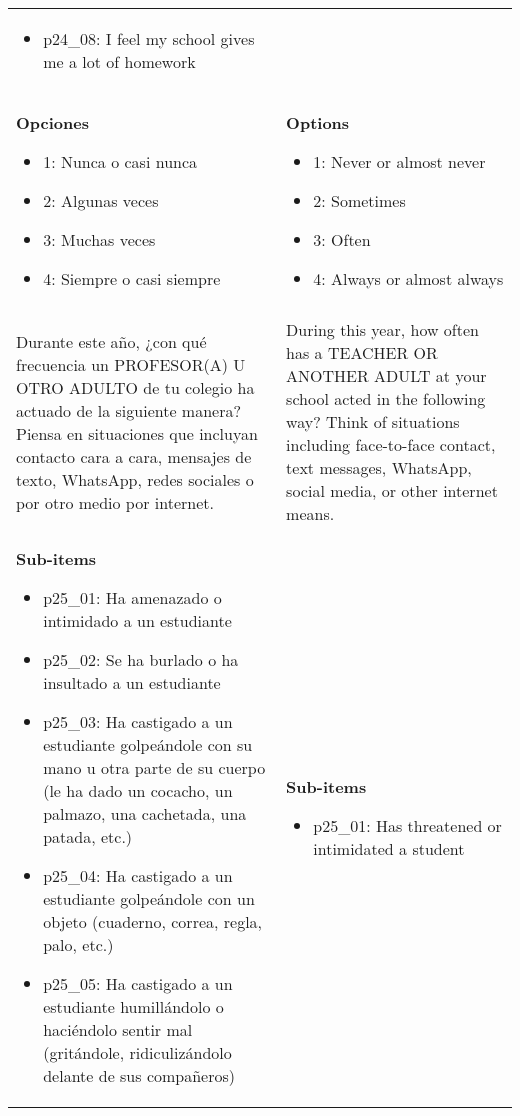 \documentclass[11pt]{article}
\begin{document}
\begin{longtable}{@{}LL@{}}
\begin{itemize}[leftmargin=*]
\item p24\_08: I feel my school gives me a lot of homework\end{itemize} \\
\textbf{Opciones}\par\begin{itemize}[leftmargin=*]\item 1: Nunca o casi nunca
\item 2: Algunas veces
\item 3: Muchas veces
\item 4: Siempre o casi siempre\end{itemize} & \textbf{Options}\par\begin{itemize}[leftmargin=*]\item 1: Never or almost never
\item 2: Sometimes
\item 3: Often
\item 4: Always or almost always\end{itemize} \\
\addlinespace[4pt]
 \\ 
Durante este año, ¿con qué frecuencia un PROFESOR(A) U OTRO ADULTO de tu colegio ha actuado de la siguiente manera? Piensa en situaciones que incluyan contacto cara a cara, mensajes de texto, WhatsApp, redes sociales o por otro medio por internet. & During this year, how often has a TEACHER OR ANOTHER ADULT at your school acted in the following way? Think of situations including face-to-face contact, text messages, WhatsApp, social media, or other internet means. \\
\textbf{Sub-items}\par\begin{itemize}[leftmargin=*]\item p25\_01: Ha amenazado o intimidado a un estudiante
\item p25\_02: Se ha burlado o ha insultado a un estudiante
\item p25\_03: Ha castigado a un estudiante golpeándole con su mano u otra parte de su cuerpo (le ha dado un cocacho, un palmazo, una cachetada, una patada, etc.)
\item p25\_04: Ha castigado a un estudiante golpeándole con un objeto (cuaderno, correa, regla, palo, etc.)
\item p25\_05: Ha castigado a un estudiante humillándolo o haciéndolo sentir mal (gritándole, ridiculizándolo delante de sus compañeros)\end{itemize} & \textbf{Sub-items}\par\begin{itemize}[leftmargin=*]\item p25\_01: Has threatened or intimidated a student

\end{itemize}
\end{longtable}
\end{document}
